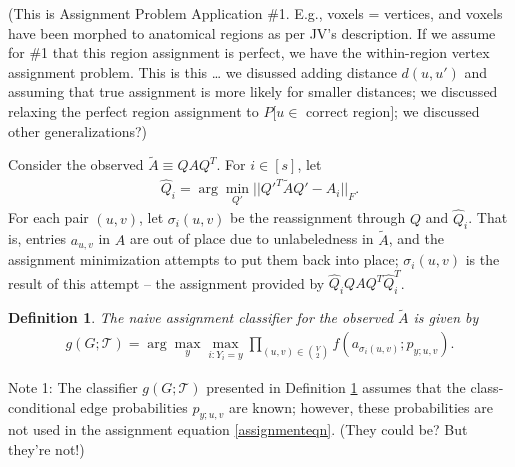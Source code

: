 \documentclass{article}
\newcommand{\mcE}{\mathcal{E}}
\newcommand{\mcT}{\mathcal{T}}
\newcommand{\hatP}{\widehat{P}}
\newcommand{\hatQ}{\widehat{Q}}
\newcommand{\tildeA}{\widetilde{A}}
\newtheorem{defi}{Definition}
\newcommand{\defa}{\begin{defi}}
\newcommand{\defb}{\end{defi}}
\begin{document}

(This is Assignment Problem Application \#1.
E.g., voxels = vertices,
and voxels have been morphed to anatomical regions as per JV's description.
If we assume for \#1 that this region assignment is perfect,
we have the within-region vertex assignment problem.
This is this \dots
we disussed adding distance $d(u,u')$ and assuming that true assignment is more likely for smaller distances;
we discussed relaxing the perfect region assignment to $P[u \in$ correct region$]$;
we discussed other generalizations?)



%
%

Consider the observed $\tildeA \equiv QAQ^T$.
For $i \in [s]$, let
\begin{eqnarray}\label{assignmenteqn}
\hatQ_i = \arg\min_{Q'} ||Q'^T \tildeA Q' - A_i||_F.
\end{eqnarray}
For each pair $(u,v)$, let $\sigma_i(u,v)$ be the reassignment through $Q$ and $\hatQ_i$.
That is, entries $a_{u,v}$ in $A$ are out of place due to unlabeledness in $\tildeA$,
and the assignment minimization attempts to put them back into place;
$\sigma_i(u,v)$ is the result of this attempt -- the assignment provided by
$\hatQ_i Q A Q^T \hatQ_i^T$.




\defa\label{nac}
The {\em naive assignment classifier} for the observed $\tildeA$ is given by
\begin{eqnarray}
g(G;\mcT) = {\arg\max_y \max_{i:Y_i=y} \prod_{(u,v) \in {V \choose 2}} f(a_{\sigma_i(u,v)};p_{y;u,v})}.
\end{eqnarray}
\defb

Note 1:
The classifier $g(G;\mcT)$ presented in Definition \ref{nac}
assumes that the class-conditional edge probabilities $p_{y;u,v}$ are known;
however, these probabilities are not used in the assignment equation \ref{assignmenteqn}.
(They could be? But they're not!)
\end{document}
